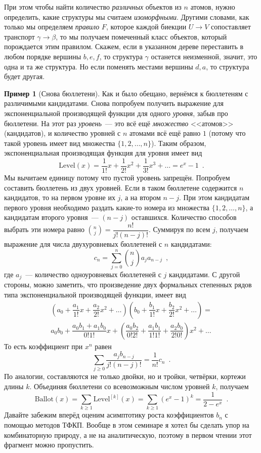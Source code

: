 \documentclass[a5paper]{article}
\theoremstyle{definition}
\newtheorem{example}{Пример}
\begin{document}
При этом чтобы найти количество \textit{различных} объектов из \( n \) атомов, 
нужно определить, какие структуры мы считаем \textit{изоморфными}. Другими 
словами, как только мы определяем \textit{правило} \( F \), которое каждой 
биекции \( U 
\to V \) сопоставляет транспорт \( \gamma \to \beta \), то мы получаем 
помеченный класс объектов, который порождается этим правилом. Скажем, 
если в 
указанном дереве переставить в любом порядке вершины \( b, e, f \), то 
структура \( \gamma \) останется неизменной, значит, это одна и та же 
структура. Но если поменять местами вершины \( d, a \), то структура будет 
другая.

\begin{example}[Снова бюллетени]
Как и было обещано, вернёмся к бюллетеням с различимыми кандидатами. Снова 
попробуем получить выражение для экспоненциальной производящей функции для 
одного \textit{уровня}, забыв про бюллетени. На этот 
раз \textit{уровень}~--- это всё ещё \textit{множество} <<атомов>> 
(кандидатов), и количество уровней с \( n \) атомами всё ещё равно \( 1 \) 
(потому что такой уровень имеет вид множества \( \{1, 2, \ldots, n\} \)). Таким 
образом, экспоненциальная производящая функция для уровня имеет вид
\[
	\mathrm{Level} (x) = \dfrac{1}{1!} x + \dfrac{1}{2!} x^2 + \dfrac{1}{3!}x^3 
	+ \ldots = e^x - 1
	\enspace .
\]
Мы вычитаем единицу потому что пустой уровень запрещён.
Попробуем составить бюллетень из двух уровней. Если в таком бюллетене 
содержится \( n \) кандидатов, то на первом уровне их \( j \), а на втором \( 
n-j \). При этом кандидатам первого уровня необходимо раздать какие-то номера 
из множества \( \{1, 2, \ldots, n\} \), а кандидатам второго уровня~--- \( 
(n-j) \) оставшихся. Количество способов выбрать эти номера равно \( {n \choose 
j} = \dfrac{n!}{j! (n-j)!} \). Суммируя по всем \( j \), получаем выражение для 
числа двухуровневых бюллетеней с \( n \) кандидатами:
\[
	c_n = \sum_{j=0}^{n} {n \choose j} a_j a_{n-j} \enspace ,
\]
где \( a_j \)~--- количество одноуровневых бюллетеней с \( j \) кандидатами. С 
другой стороны, можно заметить, что произведение двух формальных степенных 
рядов типа экспоненциальной производящей функции, имеет вид
\begin{multline*}
	\left( a_0 + \dfrac{a_1}{1!}x + \dfrac{a_2}{2!}x^2 + \ldots
    \right )
	\left( b_0 + \dfrac{b_1}{1!}x + \dfrac{b_2}{2!}x^2 + \ldots
    \right)
	= \\
	a_0 b_0 + \dfrac{a_0 b_1 + a_1 b_0}{0!1!} x + 
	\left(\dfrac{a_0 b_2}{0!2!} + \dfrac{a_1b_1}{1!1!} + \dfrac{a_2 
	b_0}{2!0!}\right)x^2 + \ldots
\end{multline*}
То есть коэффициент при \( x^n \) равен
\[
	\sum_{j \geq 0} \dfrac{a_j b_{n-j}}{j! (n-j)!} = \dfrac{1}{n!} c_n
	\enspace .
\]
По аналогии, составляются не только двойки, но и тройки, четвёрки, кортежи 
длины \( k \). Объединяя бюллетени со всевозможным числом уровней \( k \), 
получаем
\[
	\mathrm{Ballot}(x) = \sum_{k \geq 1} \mathrm{Level}^{[k]}(x) = \sum_{k \geq 
	1} (e^{x} - 1)^k = \dfrac{1}{2 - e^x} \enspace .
\]
Давайте забежим вперёд оценим асимптотику роста коэффициентов \( b_n \) с 
помощью методов ТФКП. Вообще в этом семинаре я хотел бы сделать упор на 
комбинаторную природу, а не на аналитическую, поэтому в первом чтении этот 
фрагмент можно пропустить.


\end{example}
\end{document}
